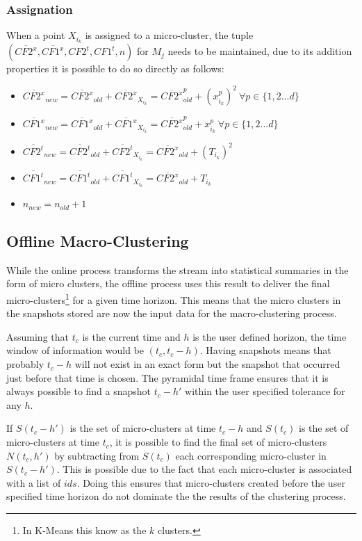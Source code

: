 \subsubsection{Assignation}

When a point $X_{i_k}$ is assigned to a micro-cluster, the tuple $(\overline{CF2^x},\overline{CF1^x},CF2^t,CF1^t,n)$ for $M_j$ needs to be maintained, due to its addition properties it is possible to do so directly as follows:

\begin{itemize}
 \item $\overline{CF2^x}_{new} = \overline{CF2^x}_{old} + \overline{CF2^x}_{X_{i_k}} = \overline{CF2^x}_{old}^p + (x^p_{i_k})^2\ \forall p \in \{1,2...d\}$
 \item $\overline{CF1^x}_{new} = \overline{CF1^x}_{old} + \overline{CF1^x}_{X_{i_k}} = \overline{CF2^x}_{old}^p + x^p_{i_k} \ \forall p \in \{1,2...d\}$
 \item $\overline{CF2^t}_{new} = \overline{CF2^t}_{old} + \overline{CF2^t}_{X_{i_k}} = \overline{CF2^x}_{old} + (T_{i_k})^2$
 \item $\overline{CF1^t}_{new} = \overline{CF1^t}_{old} + \overline{CF1^t}_{X_{i_k}} = \overline{CF2^x}_{old} + T_{i_k}$
 \item $n_{new} = n_{old} + 1$
\end{itemize}


\subsection{Offline Macro-Clustering} \label{cluOffline}

While the online process transforms the stream into statistical summaries in the form of micro clusters, the offline process uses this result to deliver the final micro-clusters\footnote{In K-Means this know as the $k$ clusters.} for a given time horizon. This means that the micro clusters in the snapshots stored are now the input data for the macro-clustering process.

Assuming that $t_c$ is the current time and $h$ is the user defined horizon, the time window of information would be $(t_c, t_c - h)$. Having snapshots means that probably $t_c - h$ will not exist in an exact form but the snapshot that occurred just before that time is chosen. The pyramidal time frame ensures that it is always possible to find a snapshot $t_c - h'$ within the user specified tolerance for any $h$.

If $S(t_c - h')$ is the set of micro-clusters at time $t_c - h$ and $S(t_c)$ is the set of micro-clusters at time $t_c$, it is possible to find the final set of micro-clusters $N(t_c,h')$ by subtracting from $S(t_c)$ each corresponding micro-cluster in $S(t_c - h')$. This is possible due to the fact that each micro-cluster is associated with a list of $ids$. Doing this ensures that micro-clusters created before the user specified time horizon do not dominate the the results of the clustering process. 

